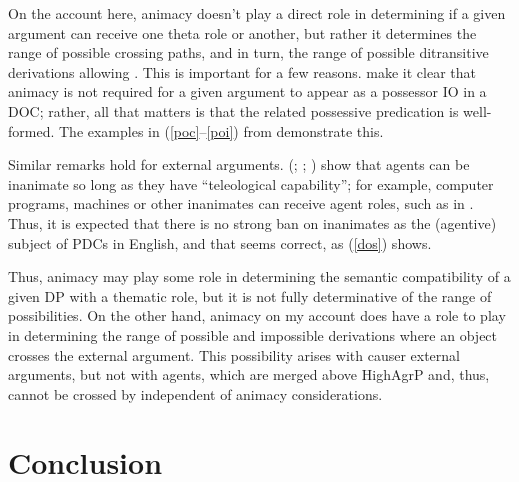 \documentclass[output=paper,colorlinks,citecolor=brown]{langscibook}
\begin{document}
On the account here, animacy doesn't play a direct role in determining if a given argument can receive one theta role or another, but rather it determines the range of possible crossing paths, and in turn, the range of possible ditransitive derivations allowing . This is important for a few reasons. \citet{gt:Harley:2015} make it clear that animacy is not required for a given argument to appear as a possessor IO in a DOC; rather, all that matters is that the related possessive predication is well-formed. The  examples in (\ref{poc}--\ref{poi}) from \citet{gt:Harley:2015} demonstrate this. 



\noindent Similar remarks hold for external arguments. \citeauthor{gt:Folli:2005} (\citeyear{gt:Folli:2005}; \citeyear{gt:Folli:2006}; \citeyear{gt:Folli:2007}) show that agents can be inanimate so long as they have ``teleological capability''; for example, computer programs, machines or other inanimates can receive agent roles, such as in . Thus, it is expected that there is no strong ban on inanimates as the (agentive) subject of PDCs in English, and that seems correct, as (\ref{dos}) shows. 


\noindent Thus, animacy may play some role in determining the semantic compatibility of a given DP with a thematic role, but it is not fully determinative of the range of possibilities. On the other hand, animacy on my account does have a role to play in determining the range of possible and impossible derivations where an object crosses the external argument. This possibility arises with causer external arguments, but not with agents, which are merged above HighAgrP and, thus, cannot be crossed by  independent of animacy considerations. 

\section{Conclusion}
\end{document}
